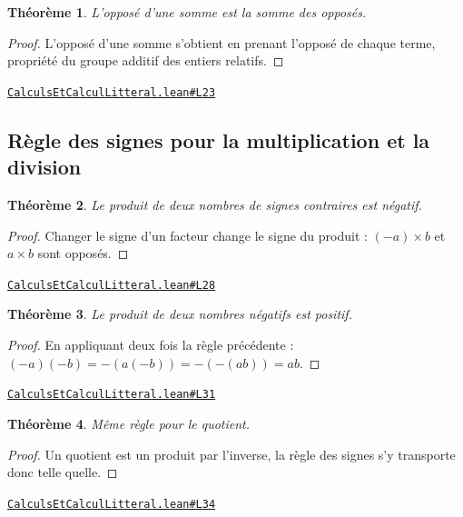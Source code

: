 \documentclass[11pt,a4paper]{article}
\theoremstyle{definition}
\theoremstyle{plain}
\newtheorem{theoreme}{Théorème}
\newcommand{\source}[2]{\par\smallskip\noindent\hfill{\footnotesize\href{#1}{\texttt{#2}}}\par\smallskip}
\begin{document}
\begin{theoreme}
L'opposé d'une somme est la somme des opposés.
\end{theoreme}

\begin{proof}
L'opposé d'une somme s'obtient en prenant l'opposé de chaque terme, propriété du
groupe additif des entiers relatifs.
\end{proof}
\source{https://github.com/Commutator-IO/learn-lean/blob/main/cours/01-college/01-nombres-et-calculs/CalculsEtCalculLitteral.lean\#L23}{CalculsEtCalculLitteral.lean\#L23}

\subsection{Règle des signes pour la multiplication et la division}

\begin{theoreme}
Le produit de deux nombres de signes contraires est négatif.
\end{theoreme}

\begin{proof}
Changer le signe d'un facteur change le signe du produit : $(-a) \times b$ et
$a \times b$ sont opposés.
\end{proof}
\source{https://github.com/Commutator-IO/learn-lean/blob/main/cours/01-college/01-nombres-et-calculs/CalculsEtCalculLitteral.lean\#L28}{CalculsEtCalculLitteral.lean\#L28}

\begin{theoreme}
Le produit de deux nombres négatifs est positif.
\end{theoreme}

\begin{proof}
En appliquant deux fois la règle précédente : $(-a)(-b) = -(a(-b)) = -(-(ab)) = ab$.
\end{proof}
\source{https://github.com/Commutator-IO/learn-lean/blob/main/cours/01-college/01-nombres-et-calculs/CalculsEtCalculLitteral.lean\#L31}{CalculsEtCalculLitteral.lean\#L31}

\begin{theoreme}
Même règle pour le quotient.
\end{theoreme}

\begin{proof}
Un quotient est un produit par l'inverse, la règle des signes s'y transporte donc
telle quelle.
\end{proof}
\source{https://github.com/Commutator-IO/learn-lean/blob/main/cours/01-college/01-nombres-et-calculs/CalculsEtCalculLitteral.lean\#L34}{CalculsEtCalculLitteral.lean\#L34}
\end{document}
